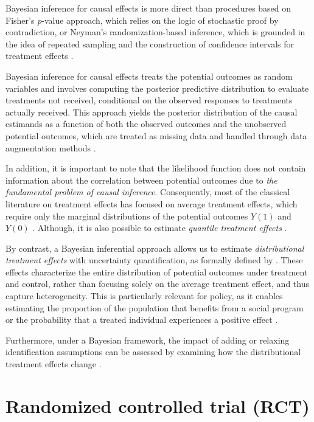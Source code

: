 Bayesian inference for causal effects \cite{rubin1978bayesian} is more direct than procedures based on Fisher's \textit{p}-value approach, which relies on the logic of stochastic proof by contradiction, or Neyman's randomization-based inference, which is grounded in the idea of repeated sampling and the construction of confidence intervals for treatment effects \cite{rubin2004teaching}.

Bayesian inference for causal effects treats the potential outcomes as random variables and involves computing the posterior predictive distribution to evaluate treatments not received, conditional on the observed responses to treatments actually received. This approach yields the posterior distribution of the causal estimands as a function of both the observed outcomes and the unobserved potential outcomes, which are treated as missing data and handled through data augmentation methods \cite{Tanner1987}. 

In addition, it is important to note that the likelihood function does not contain information about the correlation between potential outcomes due to \textit{the fundamental problem of causal inference}. Consequently, most of the classical literature on treatment effects has focused on average treatment effects, which require only the marginal distributions of the potential outcomes $Y(1)$ and $Y(0)$ \cite{heckman2014treatment}. Although, it is also possible to estimate \textit{quantile treatment effects} \cite{AbadieAngristImbens2002,Chernozhukov2005}.

By contrast, a Bayesian inferential approach allows us to estimate \textit{distributional treatment effects} with uncertainty quantification, as formally defined by \cite{aakvik2005estimating,heckman2014treatment}. These effects characterize the entire distribution of potential outcomes under treatment and control, rather than focusing solely on the average treatment effect, and thus capture heterogeneity. This is particularly relevant for policy, as it enables estimating the proportion of the population that benefits from a social program or the probability that a treated individual experiences a positive effect \cite{Ramirez2019a}.

Furthermore, under a Bayesian framework, the impact of adding or relaxing identification assumptions can be assessed by examining how the distributional treatment effects change \cite{imbens1997bayesian}.

\section{Randomized controlled trial (RCT)}\label{chap12_2}


